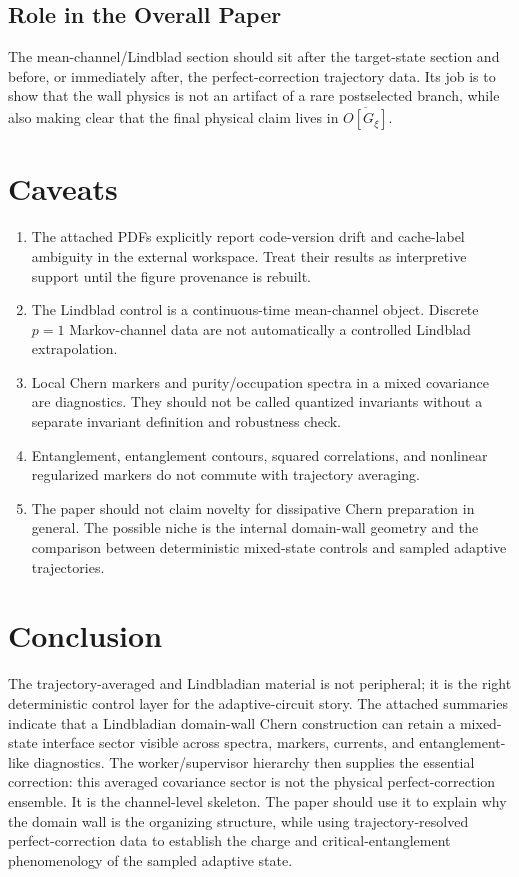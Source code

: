 \documentclass[aps,prb,onecolumn,nofootinbib,superscriptaddress]{revtex4-2}
\newcommand{\avg}[1]{\overline{#1}}
\newcommand{\Gtraj}{G_{\xi}}
\begin{document}
\subsection{Role in the Overall Paper}

The mean-channel/Lindblad section should sit after the target-state section and
before, or immediately after, the perfect-correction trajectory data.  Its job
is to show that the wall physics is not an artifact of a rare postselected
branch, while also making clear that the final physical claim lives in
\(\avg{O[\Gtraj]}\).

\section{Caveats}

\begin{enumerate}
\item The attached PDFs explicitly report code-version drift and cache-label
ambiguity in the external workspace.  Treat their results as interpretive
support until the figure provenance is rebuilt.
\item The Lindblad control is a continuous-time mean-channel object.  Discrete
\(p=1\) Markov-channel data are not automatically a controlled Lindblad
extrapolation.
\item Local Chern markers and purity/occupation spectra in a mixed covariance
are diagnostics.  They should not be called quantized invariants without a
separate invariant definition and robustness check.
\item Entanglement, entanglement contours, squared correlations, and nonlinear
regularized markers do not commute with trajectory averaging.
\item The paper should not claim novelty for dissipative Chern preparation in
general.  The possible niche is the internal domain-wall geometry and the
comparison between deterministic mixed-state controls and sampled adaptive
trajectories.
\end{enumerate}

\section{Conclusion}

The trajectory-averaged and Lindbladian material is not peripheral; it is the
right deterministic control layer for the adaptive-circuit story.  The attached
summaries indicate that a Lindbladian domain-wall Chern construction can retain
a mixed-state interface sector visible across spectra, markers, currents, and
entanglement-like diagnostics.  The worker/supervisor hierarchy then supplies
the essential correction: this averaged covariance sector is not the physical
perfect-correction ensemble.  It is the channel-level skeleton.  The paper
should use it to explain why the domain wall is the organizing structure, while
using trajectory-resolved perfect-correction data to establish the charge and
critical-entanglement phenomenology of the sampled adaptive state.
\end{document}
